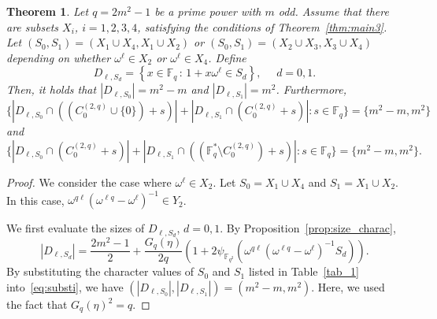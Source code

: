\documentclass[10pt]{amsart}
\newtheorem{theo}{Theorem}[section]
\theoremstyle{definition}
\newcommand*\F{{\mathbb F}}
\begin{document}
\begin{theo}\label{thm:twoint4}
Let $q=2m^2-1$ be a prime power with $m$ odd. Assume that there are subsets $X_i$, $i=1,2,3,4$, satisfying the conditions of Theorem~\ref{thm:main3}. Let $(S_0,S_1)=(X_1\cup X_4,X_1\cup X_2)$ or $(S_0,S_1)=(X_2\cup X_3,X_3\cup X_4)$ depending on whether $\omega^\ell\in X_2$ or $\omega^\ell\in X_4$. Define
\[
D_{\ell,S_d}=\left\{x\in \F_q\,:\, 1+x\omega^\ell\in S_d
\right\}, \quad \, \, d=0,1.
\]
Then, it holds that $|D_{\ell,S_0}|=m^2-m$ and $|D_{\ell,S_1}|=m^2$. Furthermore,
\[
\{|D_{\ell,S_0}\cap ((C_0^{(2,q)}\cup \{0\})+s)|+|D_{\ell,S_1}\cap (C_0^{(2,q)}+s)|:s\in \F_q\}=\{m^2-m,m^2\}
\]
and
\[
\{|D_{\ell,S_0}\cap (C_0^{(2,q)}+s)|+|D_{\ell,S_1}\cap ((\F_q^\ast\setminus C_0^{(2,q)})+s)|:s\in \F_q\}=\{m^2-m,m^2\}.
\]
\end{theo}
\begin{proof}
We consider the case where $\omega^\ell \in X_2$. Let $S_0=X_1\cup X_4$ and $S_1=X_1\cup X_2$. In this case, $\omega^{q\ell}(\omega^{\ell q}-\omega^{\ell})^{-1}\in Y_2$.

We first evaluate the sizes of $D_{\ell,S_d}$, $d=0,1$. By Proposition~\ref{prop:size_charac},
\begin{equation}\label{eq:substi}
|D_{\ell,S_d}|=\frac{2m^2-1}{2}+\frac{G_q(\eta)}{2q}(1+2\psi_{\F_{q^2}}(\omega^{q\ell}(\omega^{\ell q}-\omega^{\ell})^{-1}S_d)).
\end{equation}
By substituting the character values of $S_0$ and $S_1$ listed in Table~\ref{tab_1} into~\eqref{eq:substi}, we have $(|D_{\ell,S_0}|,|D_{\ell,S_1}|)=(m^2-m,m^2)$. Here, we used the fact that $G_q(\eta)^2=q$.


\end{proof}
\end{document}

